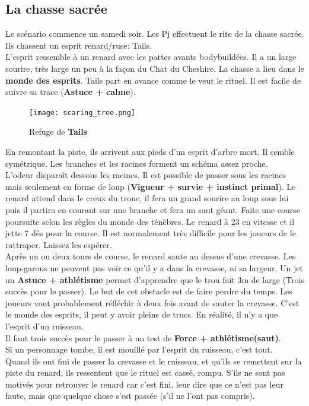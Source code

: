\documentclass[oneside,12pt]{book}
\begin{document}
\begin{flushleft}
\section{La chasse sacrée}
Le scénario commence un samedi soir.
Les Pj effectuent le rite de la chasse sacrée. Ils chassent un esprit renard/ruse: Tails. \\
L'esprit ressemble à un renard avec les pattes avants bodybuildées. Il a un large sourire, très large un peu à la façon du Chat du Cheshire. La chasse a lieu dans le \textbf{monde des esprits}. Tails part en avance comme le veut le rituel. Il est facile de suivre sa trace (\textbf{Astuce + calme}).\\
\begin{figure}[!h]
\caption{\label{arbre_mort} Refuge de \textbf{Tails}}
\texttt{[image: scaring\_tree.png]}
\end{figure}
 En remontant la piste, ils arrivent aux pieds d'un esprit d'arbre mort. Il semble symétrique. Les branches et les racines forment un schéma assez proche.\\ 
L'odeur disparaît dessous les racines. Il est possible de passer sous les racines mais seulement en forme de loup (\textbf{Vigueur + survie + instinct primal}). Le renard attend dans le creux du tronc, il fera un grand sourire au loup sous lui puis il partira en courant sur une branche et fera un saut géant. Faite une course poursuite selon les règles du monde des ténèbres. Le renard à 23 en vitesse et il jette 7 dés pour la course. Il est normalement très difficile pour les joueurs de le rattraper. Laissez les espérer.\\ 
Après un ou deux tours de course, le renard saute au dessus d'une crevasse. Les loup-garous ne peuvent pas voir ce qu'il y a dans la crevasse, ni sa largeur. Un jet un \textbf{Astuce + athlétisme} permet d'apprendre que le trou fait 3m de large (Trois succès pour le passer). Le but de cet obstacle est de faire perdre du temps. Les joueurs vont probablement réfléchir à deux fois avant de sauter la crevasse. C'est le monde des esprits, il peut y avoir pleins de trucs. En réalité, il n'y a que l'esprit d'un ruisseau. \\ 

Il faut trois succès pour le passer à un test de \textbf{Force + athlétisme(saut)}.\\ 
Si un personnage tombe, il est mouillé par l'esprit du ruisseau, c'est tout.\\
Quand ils ont fini de passer la crevasse et le ruisseau, et qu'ils se remettent sur la piste du renard, ils ressentent que le rituel est cassé, rompu. S'ils ne sont pas motivés pour retrouver le renard car c'est fini, leur dire que ce n'est pas leur faute, mais que quelque chose s'est passée (s'il ne l'ont pas compris). 


\end{flushleft}
\end{document}
